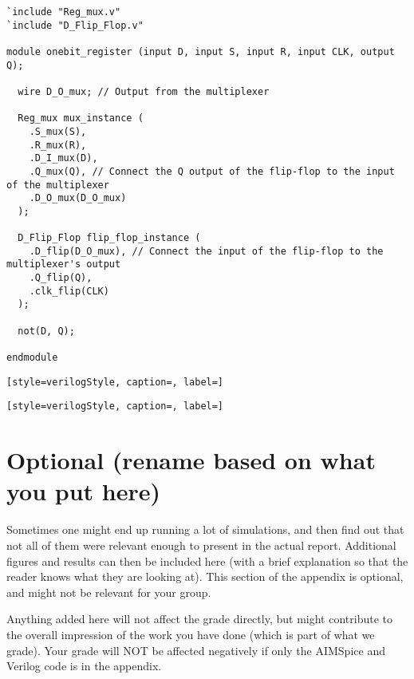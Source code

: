 \begin{lstlisting}[style=verilogStyle, caption=1-bit Register in Verilog, label=verilog_1bitregister]
`include "Reg_mux.v"
`include "D_Flip_Flop.v"

module onebit_register (input D, input S, input R, input CLK, output Q);

  wire D_O_mux; // Output from the multiplexer 

  Reg_mux mux_instance (
    .S_mux(S),
    .R_mux(R),
    .D_I_mux(D), 
    .Q_mux(Q), // Connect the Q output of the flip-flop to the input of the multiplexer  
    .D_O_mux(D_O_mux)
  );

  D_Flip_Flop flip_flop_instance (
    .D_flip(D_O_mux), // Connect the input of the flip-flop to the multiplexer's output
    .Q_flip(Q),
    .clk_flip(CLK)
  );  
  
  not(D, Q);

endmodule
\end{lstlisting}

\begin{lstlisting}[style=verilogStyle, caption=, label=]
\end{lstlisting}



\begin{lstlisting}[style=verilogStyle, caption=, label=]
\end{lstlisting}

\section{Optional (rename based on what you put here)}
Sometimes one might end up running a lot of simulations, and then find out that not all of them were relevant enough to present in the actual report. Additional figures and results can then be included here (with a brief explanation so that the reader knows what they are looking at). This section of the appendix is optional, and might not be relevant for your group. 

Anything added here will not affect the grade directly, but might contribute to the overall impression of the work you have done (which is part of what we grade). Your grade will NOT be affected negatively if only the AIMSpice and Verilog code is in the appendix.